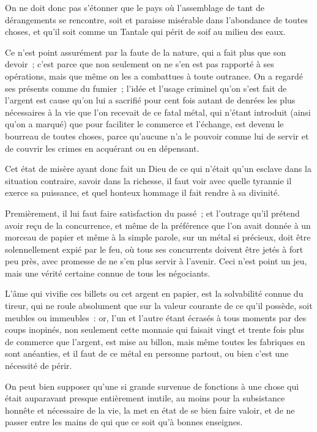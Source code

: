 \documentclass[french,twoside]{book} %
\begin{document}
On ne doit donc pas s’étonner que le pays où l’assemblage de tant de dérangements se rencontre, soit et paraisse misérable dans l’abondance de toutes choses, et qu’il soit comme un Tantale qui périt de soif au milieu des eaux.\par
Ce n’est point assurément par la faute de la nature, qui a fait plus que son devoir ; c’est parce que non seulement on ne s’en est pas rapporté à ses opérations, mais que même on les a combattues à toute outrance. On a regardé ses présents comme du fumier ; l’idée et l’usage criminel qu’on s’est fait de l’argent est cause qu’on lui a sacrifié pour cent fois autant de denrées les plus nécessaires à la vie que l’on recevait de ce fatal métal, qui n’étant introduit (ainsi qu’on a marqué) que pour faciliter le commerce et l’échange, est devenu le bourreau de toutes choses, parce qu’aucune n’a le pouvoir comme lui de servir et de couvrir les crimes en acquérant ou en dépensant.\par
Cet état de misère ayant donc fait un Dieu de ce qui n’était qu’un esclave dans la situation contraire, savoir dans la richesse, il faut voir avec quelle tyrannie il exerce sa puissance, et quel honteux hommage il fait rendre à sa divinité.\par
Premièrement, il lui faut faire satisfaction du passé ; et l’outrage qu’il prétend avoir reçu de la concurrence, et même de la préférence que l’on avait donnée à un morceau de papier et même à la simple parole, sur un métal si précieux, doit être solennellement expié par le feu, où tous ses concurrents doivent être jetés à fort peu près, avec promesse de ne s’en plus servir à l’avenir. Ceci n’est point un jeu, mais une vérité certaine connue de tous les négociants.\par
L’âme qui vivifie ces billets ou cet argent en papier, est la solvabilité connue du tireur, qui ne roule absolument que sur la valeur courante de ce qu’il possède, soit meubles ou immeubles : or, l’un et l’autre étant écrasés à tous moments par des coups inopinés, non seulement cette monnaie qui faisait vingt et trente fois plus de commerce que l’argent, est mise au billon, mais même toutes les fabriques en sont anéanties, et il faut de ce métal en personne partout, ou bien c’est une nécessité de périr.\par
On peut bien supposer qu’une si grande survenue de fonctions à une chose qui était auparavant presque entièrement inutile, au moins pour la subsistance honnête et nécessaire de la vie, la met en état de se bien faire valoir, et de ne passer entre les mains de qui que ce soit qu’à bonnes enseignes.\par
\end{document}
